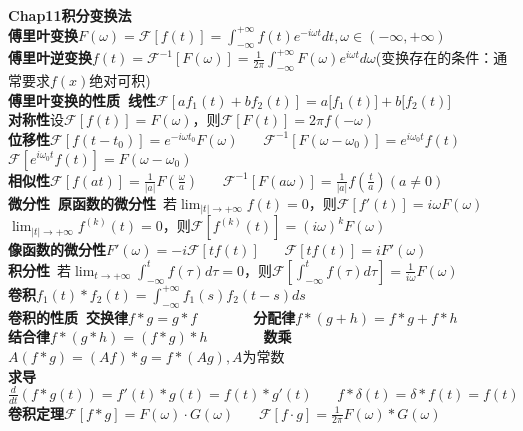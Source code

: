 \documentclass[10pt,a4paper]{article}
\begin{document}
\begin{multicols}{2}
\textbf{Chap11积分变换法}\\
\textbf{傅里叶变换}$F(\omega)=\mathcal{F}[f(t)]=\int_{-\infty}^{+\infty}f(t)e^{-i\omega t}dt,\omega\in(-\infty,+\infty)$\\
\textbf{傅里叶逆变换}$f(t)=\mathcal{F}^{-1}[F(\omega)]=\frac{1}{2\pi}\int_{-\infty}^{+\infty}F(\omega)e^{i\omega t}d\omega$(变换存在的条件：通常要求$f(x)$绝对可积)\\
\textbf{傅里叶变换的性质~线性}$\mathcal{F}[af_1(t)+bf_2(t)]=a\mathcal[f_1(t)]+b\mathcal[f_2(t)]$\\
\indent\textbf{对称性}设$\mathcal{F}[f(t)]=F(\omega)$，则$\mathcal{F}[F(t)]=2\pi f(-\omega)$\\
\indent\textbf{位移性}$\mathcal{F}[f(t-t_0)]=e^{-i\omega t_0}F(\omega)~~~~~~~~\mathcal{F}^{-1}[F(\omega-\omega_0)]=e^{i\omega_0t}f(t)$\\
\indent\indent$\mathcal{F}[e^{i\omega_0t}f(t)]=F(\omega-\omega_0)$\\
\indent\textbf{相似性}$\mathcal{F}[f(at)]=\frac{1}{|a|}F(\frac{\omega}{a})~~~~~~~~\mathcal{F}^{-1}[F(a\omega)]=\frac{1}{|a|}f(\frac{t}{a})(a\neq0)$\\
\indent\textbf{微分性~原函数的微分性}~若$\lim_{|t|\to+\infty}f(t)=0$，则$\mathcal{F}[f'(t)]=i\omega F(\omega)$\\
\indent\indent\indent{}$\lim_{|t|\to+\infty}f^{(k)}(t)=0$，则$\mathcal{F}[f^{(k)}(t)]=(i\omega)^kF(\omega)$\\
\indent\indent\textbf{像函数的微分性}$F'(\omega)=-i\mathcal{F}[tf(t)]~~~~~~~~\mathcal{F}[tf(t)]=iF'(\omega)$\\
\indent\textbf{积分性}~若$\lim_{t\to+\infty}\int_{-\infty}^tf(\tau)d\tau=0$，则$\mathcal{F}[\int_{-\infty}^tf(\tau)d\tau]=\frac{1}{i\omega}F(\omega)$\\
\indent\textbf{卷积}$f_1(t)*f_2(t)=\int_{-\infty}^{+\infty}f_1(s)f_2(t-s)ds$\\
\indent\textbf{卷积的性质~交换律}$f*g=g*f$~~~~~~~~\textbf{分配律}$f*(g+h)=f*g+f*h$\\
\indent\indent\textbf{结合律}$f*(g*h)=(f*g)*h$~~~~~~~~\textbf{数乘}$A(f*g)=(Af)*g=f*(Ag),A$为常数\\
\indent\indent\textbf{求导}$\frac{d}{dt}(f*g(t))=f'(t)*g(t)=f(t)*g'(t)~~~~~~~~f*\delta(t)=\delta*f(t)=f(t)$\\
\indent\textbf{卷积定理}$\mathcal{F}[f*g]=F(\omega)\cdot G(\omega)~~~~~~~~\mathcal{F}[f\cdot g]=\frac{1}{2\pi}F(\omega)*G(\omega)$\\

\end{multicols}
\end{document}

